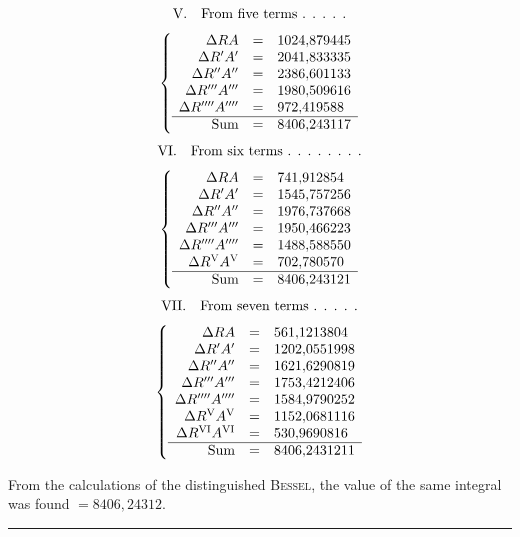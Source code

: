 \[
\begin{gathered}\mbox{V.\quad From five terms . . . . .}\\[3pt]
\left\{\begin{array}{rcl}
\Delta RA&=&1024{,}879445\\
\Delta R'A'&=&2041{,}833335\\
\Delta R''A''&=&2386{,}601133\\
\Delta R'''A'''&=&1980{,}509616\\
\Delta R''''A''''&=&972{,}419588\\ \hline
\mbox{Sum}&=&8406{,}243117
\end{array}\right.\end{gathered}
\]
\[
\begin{gathered}\mbox{VI.\quad From six terms . . . . . . . .}\\[3pt]
\left\{\begin{array}{rcl}
\Delta RA&=&741{,}912854\\
\Delta R'A'&=&1545{,}757256\\
\Delta R''A''&=&1976{,}737668\\
\Delta R'''A'''&=&1950{,}466223\\
\Delta R''''A''''&=&1488{,}588550\\
\Delta R^{\mathrm{V}}A^{\mathrm{V}}&=&702{,}780570\\ \hline
\mbox{Sum}&=&8406{,}243121
\end{array}\right.\end{gathered}
\]
\[
\begin{gathered}\mbox{VII.\quad From seven terms . . . . .}\\[3pt]
\left\{\begin{array}{rcl}
\Delta RA&=&561{,}1213804\\
\Delta R'A'&=&1202{,}0551998\\
\Delta R''A''&=&1621{,}6290819\\
\Delta R'''A'''&=&1753{,}4212406\\
\Delta R''''A''''&=&1584{,}9790252\\
\Delta R^{\mathrm{V}}A^{\mathrm{V}}&=&1152{,}0681116\\
\Delta R^{\mathrm{VI}}A^{\mathrm{VI}}&=&530{,}9690816\\ \hline
\mbox{Sum}&=&8406{,}2431211
\end{array}\right.\end{gathered}
\]

From the calculations of the distinguished \textsc{Bessel}, the value of the same integral was found $=8406{,}24312$.

\begin{center}\rule{0.24\linewidth}{0.3pt}\end{center}
